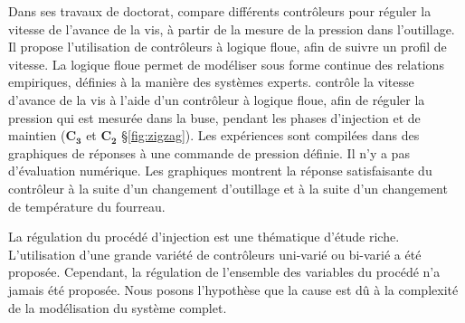 Dans ses travaux de doctorat, \cite{tsoi_fuzzy_1997} compare différents contrôleurs pour réguler la vitesse de l'avance de la vis, à partir de la mesure de la pression dans l'outillage.
Il propose l'utilisation de contrôleurs à logique floue, afin de suivre un profil de vitesse.
La logique floue permet de modéliser sous forme continue des relations empiriques, définies à la manière des systèmes experts.
\cite{huang_fuzzy_2000} contrôle la vitesse d’avance de la vis à l'aide d'un contrôleur à logique floue, afin de réguler la pression qui est mesurée dans la buse, pendant les phases d’injection et de maintien ($\boldsymbol{C_3}$ et $\boldsymbol{C_2}$ §\ref{fig:zigzag}).
Les expériences sont compilées dans des graphiques de réponses à une commande de pression définie.
Il n'y a pas d’évaluation numérique.
Les graphiques montrent la réponse satisfaisante du contrôleur à la suite d'un changement d'outillage et à la suite d'un changement de température du fourreau.

La régulation du procédé d'injection est une thématique d'étude riche.
L'utilisation d'une grande variété de contrôleurs uni-varié ou bi-varié a été proposée.
Cependant, la régulation de l'ensemble des variables du procédé n'a jamais été proposée.
Nous posons l'hypothèse que la cause est dû à la complexité de la modélisation du système complet.

